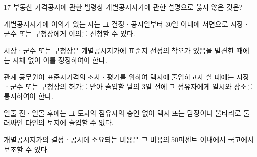 \begin{question}{17}
부동산 가격공시에 관한 법령상 개별공시지가에 관한 설명으로 옳지 않은 것은?
\begin{choices}
  \item 개별공시지가에 이의가 있는 자는 그 결정ㆍ공시일부터 30일 이내에 서면으로 시장ㆍ군수 또는 구청장에게 이의를 신청할 수 있다.
  \item 시장ㆍ군수 또는 구청장은 개별공시지가에 표준지 선정의 착오가 있음을 발견한 때에는 지체 없이 이를 정정하여야 한다.
  \item 관계 공무원이 표준지가격의 조사ㆍ평가를 위하여 택지에 출입하고자 할 때에는 시장ㆍ군수 또는 구청장의 허가를 받아 출입할 날의 3일 전에 그 점유자에게 일시와 장소를 통지하여야 한다.
  \item 일출 전ㆍ일몰 후에는 그 토지의 점유자의 승인 없이 택지 또는 담장이나 울타리로 둘러싸인 타인의 토지에 출입할 수 없다.
  \item 개별공시지가의 결정ㆍ공시에 소요되는 비용은 그 비용의 50퍼센트 이내에서 국고에서 보조할 수 있다.
\end{choices}
\end{question}
